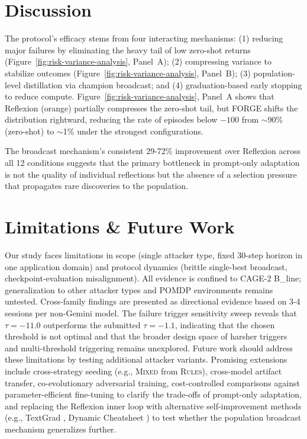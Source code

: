 \documentclass[sigconf]{acmart}
\begin{document}
\section{Discussion}
The protocol's efficacy stems from four interacting mechanisms: (1) reducing major failures by eliminating the heavy tail of low zero-shot returns (Figure~\ref{fig:risk-variance-analysis}, Panel~A); (2) compressing variance to stabilize outcomes (Figure~\ref{fig:risk-variance-analysis}, Panel~B); (3) population-level distillation via champion broadcast; and (4) graduation-based early stopping to reduce compute. Figure~\ref{fig:risk-variance-analysis}, Panel~A shows that Reflexion (orange) partially compresses the zero-shot tail, but FORGE shifts the distribution rightward, reducing the rate of episodes below $-100$ from $\sim$90\% (zero-shot) to $\sim$1\% under the strongest configurations.

The broadcast mechanism's consistent 29-72\% improvement over Reflexion across all 12 conditions suggests that the primary bottleneck in prompt-only adaptation is not the quality of individual reflections but the absence of a selection pressure that propagates rare discoveries to the population.

\section{Limitations \& Future Work}
Our study faces limitations in scope (single attacker type, fixed 30-step horizon in one application domain) and protocol dynamics (brittle single-best broadcast, checkpoint-evaluation misalignment). All evidence is confined to CAGE-2 B\_line; generalization to other attacker types and POMDP environments remains untested. Cross-family findings are presented as directional evidence based on 3-4 sessions per non-Gemini model. The failure trigger sensitivity sweep reveals that $\tau=-11.0$ outperforms the submitted $\tau=-1.1$, indicating that the chosen threshold is not optimal and that the broader design space of harsher triggers and multi-threshold triggering remains unexplored. Future work should address these limitations by testing additional attacker variants. Promising extensions include cross-strategy seeding (e.g., \textsc{Mixed} from \textsc{Rules}), cross-model artifact transfer, co-evolutionary adversarial training, cost-controlled comparisons against parameter-efficient fine-tuning to clarify the trade-offs of prompt-only adaptation, and replacing the Reflexion inner loop with alternative self-improvement methods (e.g., TextGrad \citep{yuksekgonul2024textgradautomaticdifferentiationtext}, Dynamic Cheatsheet \citep{suzgun2025cheatsheet}) to test whether the population broadcast mechanism generalizes further.
\end{document}
